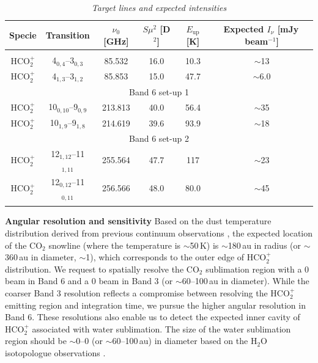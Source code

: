 \documentclass[12pt,a4paper]{article}  %
\newcommand{\carbondioxide}{CO$_2$\xspace}
\newcommand{\protonatedcarbondioxide}{HCO$_2^+$\xspace}
\newcommand{\water}{H$_2$O\xspace}
\begin{document}
\begin{table}[tbh]
\vspace{-1em}
\begin{center}
\caption[]{\emph{Target lines and expected intensities}}
\begin{tabular}{cccccc}
\hline \hline \noalign {\smallskip}
Specie & Transition & $\nu_0$ [GHz] & $S\mu^2$ [D$^2$] & $E_\mathrm{up}$ [K] & Expected $I_\nu$ [mJy\,beam$^{-1}$] \\
\hline \noalign {\smallskip}
\multicolumn{6}{c}{Band 3 set-up} \\
\hline
\protonatedcarbondioxide & 4$_{0,4}$--3$_{0,3}$ & 85.532 & 16.0 & 10.3 & $\sim$13 \\
\protonatedcarbondioxide & 4$_{1,3}$--3$_{1,2}$ & 85.853 & 15.0 & 47.7 & $\sim$6.0 \\
\hline 
\multicolumn{6}{c}{Band 6 set-up 1} \\
\hline
\protonatedcarbondioxide & 10$_{0,10}$--9$_{0,9}$ & 213.813 & 40.0 & 56.4 & $\sim$35 \\
\protonatedcarbondioxide & 10$_{1,9}$--9$_{1,8}$ & 214.619 & 39.6 & 93.9 & $\sim$18 \\
\hline 
\multicolumn{6}{c}{Band 6 set-up 2} \\
\hline
\protonatedcarbondioxide & 12$_{1,12}$--11$_{1,11}$ & 255.564 & 47.7 & 117 & $\sim$23 \\
\protonatedcarbondioxide & 12$_{0,12}$--11$_{0,11}$ & 256.566 & 48.0 & 80.0 & $\sim$45 \\
\hline \noalign {\smallskip}
\end{tabular}
\label{tab:lines}
\end{center}
\vspace{-2em}
\end{table}

\noindent \textbf{Angular resolution and sensitivity} \quad Based on the dust temperature distribution derived from previous continuum observations \citep{Jacobsen19}, the expected location of the \carbondioxide snowline (where the temperature is $\sim$50\,K) is $\sim$180\,au in radius (or $\sim$360\,au in diameter, $\sim$1), which corresponds to the outer edge of \protonatedcarbondioxide distribution. We request to spatially resolve the \carbondioxide sublimation region with a 0 beam in Band 6 and a 0 beam in Band 3 (or $\sim$60--100\,au in diameter). While the coarser Band 3 resolution reflects a compromise between resolving the \protonatedcarbondioxide emitting region and integration time, we pursue the higher angular resolution in Band 6. These resolutions also enable us to detect the expected inner cavity of \protonatedcarbondioxide associated with water sublimation. The size of the water sublimation region should be $\sim$0--0 (or $\sim$60--100\,au) in diameter based on the \water isotopologue observations \citep{Jensen19, Jensen21}. 
\end{document}
